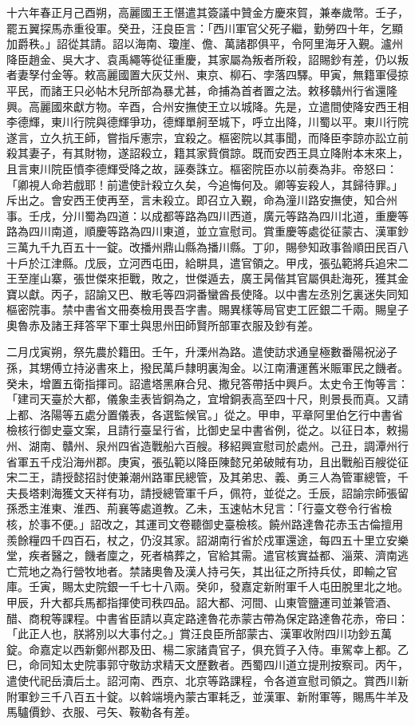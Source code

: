 \begin{pinyinscope}
 十六年春正月己酉朔，高麗國王王愖遣其簽議中贊金方慶來賀，兼奉歲幣。壬子，罷五翼探馬赤重役軍。癸丑，汪良臣言：「西川軍官父死子繼，勤勞四十年，乞顯加爵秩。」詔從其請。詔以海南、瓊崖、儋、萬諸郡俱平，令阿里海牙入覲。瀘州降臣趙金、吳大才、袁禹繩等從征重慶，其家屬為叛者所殺，詔賜鈔有差，仍以叛者妻孥付金等。敕高麗國置大灰艾州、東京、柳石、孛落四驛。甲寅，無籍軍侵掠平民，而諸王只必帖木兒所部為暴尤甚，命捕為首者置之法。敕移贛州行省還隆興。高麗國來獻方物。辛酉，合州安撫使王立以城降。先是，立遣間使降安西王相李德輝，東川行院與德輝爭功，德輝單舸至城下，呼立出降，川蜀以平。東川行院遂言，立久抗王師，嘗指斥憲宗，宜殺之。樞密院以其事聞，而降臣李諒亦訟立前殺其妻子，有其財物，遂詔殺立，籍其家貲償諒。既而安西王具立降附本末來上，且言東川院臣憤李德輝受降之故，誣奏誅立。樞密院臣亦以前奏為非。帝怒曰：「卿視人命若戲耶！前遣使計殺立久矣，今追悔何及。卿等妄殺人，其歸待罪。」斥出之。會安西王使再至，言未殺立。即召立入覲，命為潼川路安撫使，知合州事。壬戌，分川蜀為四道：以成都等路為四川西道，廣元等路為四川北道，重慶等路為四川南道，順慶等路為四川東道，並立宣慰司。賞重慶等處從征蒙古、漢軍鈔三萬九千九百五十一錠。改播州鼎山縣為播川縣。丁卯，賜參知政事昝順田民百八十戶於江津縣。戊辰，立河西屯田，給畊具，遣官領之。甲戌，張弘範將兵追宋二王至崖山寨，張世傑來拒戰，敗之，世傑遁去，廣王昺偕其官屬俱赴海死，獲其金寶以獻。丙子，詔諭又巴、散毛等四洞番蠻酋長使降。以中書左丞別乞裏迷失同知樞密院事。禁中書省文冊奏檢用畏吾字書。賜異樣等局官吏工匠銀二千兩。賜皇子奧魯赤及諸王拜答罕下軍士與思州田師賢所部軍衣服及鈔有差。



 二月戊寅朔，祭先農於籍田。壬午，升溧州為路。遣使訪求通皇極數番陽祝泌子孫，其甥傅立持泌書來上，撥民萬戶隸明裏淘金。以江南漕運舊米賑軍民之饑者。癸未，增置五衛指揮司。詔遣塔黑麻合兒、撒兒答帶括中興戶。太史令王恂等言：「建司天臺於大都，儀象圭表皆銅為之，宜增銅表高至四十尺，則景長而真。又請上都、洛陽等五處分置儀表，各選監候官。」從之。甲申，平章阿里伯乞行中書省檢核行御史臺文案，且請行臺呈行省，比御史呈中書省例，從之。以征日本，敕揚州、湖南、贛州、泉州四省造戰船六百艘。移紹興宣慰司於處州。己丑，調潭州行省軍五千戍沿海州郡。庚寅，張弘範以降臣陳懿兄弟破賊有功，且出戰船百艘從征宋二王，請授懿招討使兼潮州路軍民總管，及其弟忠、義、勇三人為管軍總管，千夫長塔剌海獲文天祥有功，請授總管軍千戶，佩符，並從之。壬辰，詔諭宗師張留孫悉主淮東、淮西、荊襄等處道教。乙未，玉速帖木兒言：「行臺文卷令行省檢核，於事不便。」詔改之，其運司文卷聽御史臺檢核。饒州路達魯花赤玉古倫擅用羨餘糧四千四百石，杖之，仍沒其家。詔湖南行省於戍軍還途，每四五十里立安樂堂，疾者醫之，饑者廩之，死者槁葬之，官給其需。遣官核實益都、淄萊、濟南逃亡荒地之為行營牧地者。禁諸奧魯及漢人持弓矢，其出征之所持兵仗，即輸之官庫。壬寅，賜太史院銀一千七十八兩。癸卯，發嘉定新附軍千人屯田脫里北之地。甲辰，升大都兵馬都指揮使司秩四品。詔大都、河間、山東管鹽運司並兼管酒、醋、商稅等課程。中書省臣請以真定路達魯花赤蒙古帶為保定路達魯花赤，帝曰：「此正人也，朕將別以大事付之。」賞汪良臣所部蒙古、漢軍收附四川功鈔五萬錠。命嘉定以西新鄭州郡及田、楊二家諸貴官子，俱充質子入侍。車駕幸上都。乙巳，命同知太史院事郭守敬訪求精天文歷數者。西蜀四川道立提刑按察司。丙午，遣使代祀岳瀆后土。詔河南、西京、北京等路課程，令各道宣慰司領之。賞西川新附軍鈔三千八百五十錠。以斡端境內蒙古軍耗乏，並漢軍、新附軍等，賜馬牛羊及馬驢價鈔、衣服、弓矢、鞍勒各有差。




\end{pinyinscope}
